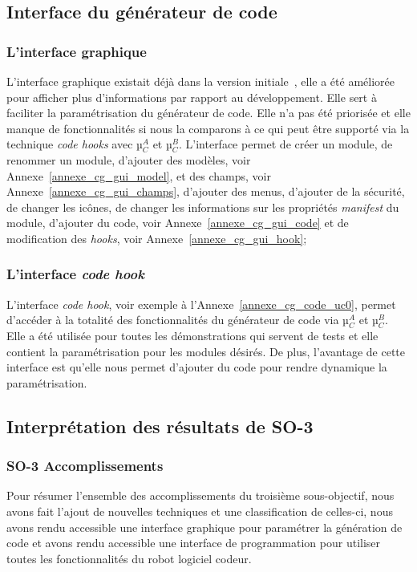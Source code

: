 \subsection{Interface du générateur de code}

\subsubsection{L'interface graphique}

 L'interface graphique existait déjà dans la version initiale~\cite{bluiksnot_repo}, elle a été améliorée pour afficher plus d'informations par rapport au développement. Elle sert à faciliter la paramétrisation du générateur de code. Elle n’a pas été priorisée et elle manque de fonctionnalités si nous la comparons à ce qui peut être supporté via la technique \textit{code hooks} avec µ$_C^A$ et µ$_C^B$. L'interface permet de créer un module, de renommer un module, d'ajouter des modèles, voir Annexe~\ref{annexe_cg_gui_model}, et des champs, voir Annexe~\ref{annexe_cg_gui_champs}, d'ajouter des menus, d'ajouter de la sécurité, de changer les icônes, de changer les informations sur les propriétés \textit{manifest }du module, d'ajouter du code, voir Annexe~\ref{annexe_cg_gui_code} et de modification des \textit{hooks}, voir Annexe~\ref{annexe_cg_gui_hook};

\subsubsection{L'interface \textit{code \textit{hook}}}

L'interface \textit{code \textit{hook}}, voir exemple à l'Annexe~\ref{annexe_cg_code_uc0}, permet d’accéder à la totalité des fonctionnalités du générateur de code via µ$_C^A$ et µ$_C^B$. Elle a été utilisée pour toutes les démonstrations qui servent de tests et elle contient la paramétrisation pour les modules désirés. De plus, l'avantage de cette interface est qu'elle nous permet d'ajouter du code pour rendre dynamique la paramétrisation.

\subsection{Interprétation des résultats de SO-3}

\subsubsection{SO-3 Accomplissements}
Pour résumer l'ensemble des accomplissements du troisième sous-objectif, nous avons fait l'ajout de nouvelles techniques et une classification de celles-ci, nous avons rendu accessible une interface graphique pour paramétrer la génération de code et avons rendu accessible une interface de programmation pour utiliser toutes les fonctionnalités du robot logiciel codeur.


